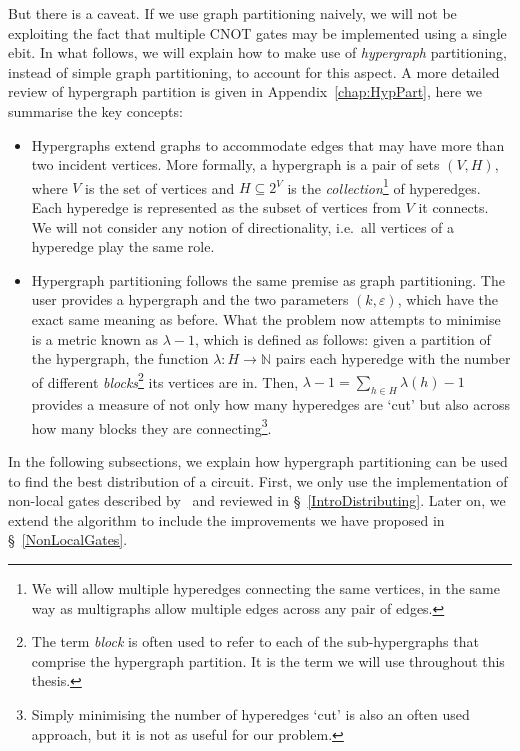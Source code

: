 But there is a caveat. If we use graph partitioning naively, we will not be exploiting the fact that multiple CNOT gates may be implemented using a single ebit. In what follows, we will explain how to make use of \textit{hypergraph} partitioning, instead of simple graph partitioning, to account for this aspect. A more detailed review of hypergraph partition is given in Appendix~\ref{chap:HypPart}, here we summarise the key concepts:

\begin{itemize}
  \item Hypergraphs extend graphs to accommodate edges that may have more than two incident vertices. More formally, a hypergraph is a pair of sets \((V,H)\), where \(V\) is the set of vertices and \(H \subseteq 2^V\) is the \textit{collection}\footnote{We will allow multiple hyperedges connecting the same vertices, in the same way as multigraphs allow multiple edges across any pair of edges.} of hyperedges. Each hyperedge is represented as the subset of vertices from \(V\) it connects. We will not consider any notion of directionality, i.e.\ all vertices of a hyperedge play the same role.
  \item Hypergraph partitioning follows the same premise as graph partitioning. The user provides a hypergraph and the two parameters \((k,\varepsilon)\), which have the exact same meaning as before. What the problem now attempts to minimise is a metric known as \(\lambda\!-\!1\), which is defined as follows: given a partition of the hypergraph, the function \(\lambda\colon H \to \mathbb{N}\) pairs each hyperedge with the number of different \textit{blocks}\footnote{The term \textit{block} is often used to refer to each of the sub-hypergraphs that comprise the hypergraph partition. It is the term we will use throughout this thesis.} its vertices are in. Then, \(\lambda\!-\!1 = \sum_{h \in H} \lambda(h) - 1\) provides a measure of not only how many hyperedges are `cut' but also across how many blocks they are connecting\footnote{Simply minimising the number of hyperedges `cut' is also an often used approach, but it is not as useful for our problem.}.
\end{itemize}

In the following subsections, we explain how hypergraph partitioning can be used to find the best distribution of a circuit. First, we only use the implementation of non-local gates described by~\citet{NonLocalCNOT} and reviewed in \S~\ref{IntroDistributing}. Later on, we extend the algorithm to include the improvements we have proposed in \S~\ref{NonLocalGates}.

